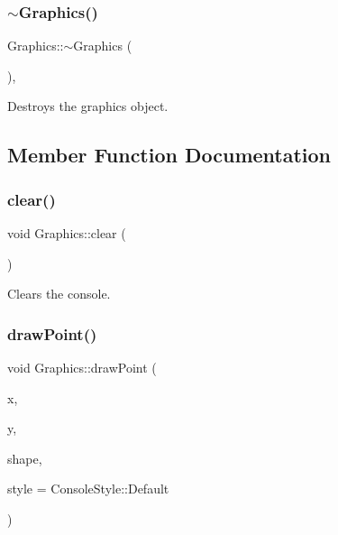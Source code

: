 \subsubsection{\texorpdfstring{$\sim$Graphics()}{~Graphics()}}
{\footnotesize\ttfamily Graphics\+::$\sim$\+Graphics (\begin{DoxyParamCaption}{ }\end{DoxyParamCaption})\hspace{0.3cm}{\ttfamily [override]}, {\ttfamily [virtual]}}



Destroys the graphics object. 



\subsection{Member Function Documentation}
\mbox{\label{class_graphics_a5006edbbdc540af376d4787f9d56fbdd}} 
\subsubsection{\texorpdfstring{clear()}{clear()}}
{\footnotesize\ttfamily void Graphics\+::clear (\begin{DoxyParamCaption}{ }\end{DoxyParamCaption})}



Clears the console. 

\mbox{\label{class_graphics_a62c143f81f50dd3f15e256e46fa4bd62}} 
\subsubsection{\texorpdfstring{drawPoint()}{drawPoint()}}
{\footnotesize\ttfamily void Graphics\+::draw\+Point (\begin{DoxyParamCaption}\item[{int32\+\_\+t}]{x,  }\item[{int32\+\_\+t}]{y,  }\item[{char}]{shape,  }\item[{Console\+Style}]{style = {\ttfamily ConsoleStyle\+:\+:Default} }\end{DoxyParamCaption})}



